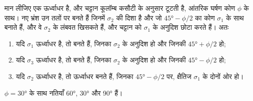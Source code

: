 \begin{theorem}[एंडरसन का भ्रंश-सिद्धांत]\label{thm:b1:faults-folds-fabrics:anderson}
मान लीजिए एक  ऊर्ध्वाधर है, और चट्टान कूलॉम्ब कसौटी के अनुसार टूटती है, आंतरिक घर्षण कोण $\phi$ के साथ। नए भ्रंश उन तलों पर बनते हैं जिनमें $\sigma_2$ की दिशा है और जो $\ang{45} - \phi/2$ का कोण $\sigma_1$ के साथ बनाते हैं, और वे $\sigma_2$ के लंबवत खिसकते हैं, और चट्टान को $\sigma_1$ के अनुदिश छोटा करते हैं। अतः
\begin{enumerate}[label=(\alph*)]
  \item यदि $\sigma_1$ ऊर्ध्वाधर है, तो  बनते हैं, जिनका  $\sigma_2$ के अनुदिश हो और जिनकी  $\ang{45} + \phi/2$ हो;
  \item यदि $\sigma_3$ ऊर्ध्वाधर है, तो  बनते हैं, जिनका  $\sigma_2$ के अनुदिश हो और जिनकी  $\ang{45} - \phi/2$ हो;
  \item यदि $\sigma_2$ ऊर्ध्वाधर है, तो ऊर्ध्वाधर  बनते हैं, जिनका  $\ang{45} - \phi/2$ पर, क्षैतिज $\sigma_1$ के दोनों ओर हो।
\end{enumerate}
$\phi = \ang{30}$ के साथ नतियाँ \ang{60}, \ang{30} और \ang{90} हैं।
\end{theorem}

